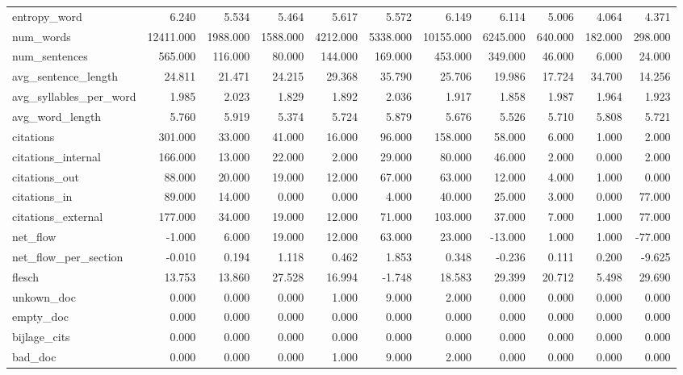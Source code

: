 \begin{tabular}{lrrrrrrrrrr}
\cline{1-11}
entropy\_word & 6.240 & 5.534 & 5.464 & 5.617 & 5.572 & 6.149 & 6.114 & 5.006 & 4.064 & 4.371 \\
\cline{1-11}
num\_words & 12411.000 & 1988.000 & 1588.000 & 4212.000 & 5338.000 & 10155.000 & 6245.000 & 640.000 & 182.000 & 298.000 \\
\cline{1-11}
num\_sentences & 565.000 & 116.000 & 80.000 & 144.000 & 169.000 & 453.000 & 349.000 & 46.000 & 6.000 & 24.000 \\
\cline{1-11}
avg\_sentence\_length & 24.811 & 21.471 & 24.215 & 29.368 & 35.790 & 25.706 & 19.986 & 17.724 & 34.700 & 14.256 \\
\cline{1-11}
avg\_syllables\_per\_word & 1.985 & 2.023 & 1.829 & 1.892 & 2.036 & 1.917 & 1.858 & 1.987 & 1.964 & 1.923 \\
\cline{1-11}
avg\_word\_length & 5.760 & 5.919 & 5.374 & 5.724 & 5.879 & 5.676 & 5.526 & 5.710 & 5.808 & 5.721 \\
\cline{1-11}
citations & 301.000 & 33.000 & 41.000 & 16.000 & 96.000 & 158.000 & 58.000 & 6.000 & 1.000 & 2.000 \\
\cline{1-11}
citations\_internal & 166.000 & 13.000 & 22.000 & 2.000 & 29.000 & 80.000 & 46.000 & 2.000 & 0.000 & 2.000 \\
\cline{1-11}
citations\_out & 88.000 & 20.000 & 19.000 & 12.000 & 67.000 & 63.000 & 12.000 & 4.000 & 1.000 & 0.000 \\
\cline{1-11}
citations\_in & 89.000 & 14.000 & 0.000 & 0.000 & 4.000 & 40.000 & 25.000 & 3.000 & 0.000 & 77.000 \\
\cline{1-11}
citations\_external & 177.000 & 34.000 & 19.000 & 12.000 & 71.000 & 103.000 & 37.000 & 7.000 & 1.000 & 77.000 \\
\cline{1-11}
net\_flow & -1.000 & 6.000 & 19.000 & 12.000 & 63.000 & 23.000 & -13.000 & 1.000 & 1.000 & -77.000 \\
\cline{1-11}
net\_flow\_per\_section & -0.010 & 0.194 & 1.118 & 0.462 & 1.853 & 0.348 & -0.236 & 0.111 & 0.200 & -9.625 \\
\cline{1-11}
flesch & 13.753 & 13.860 & 27.528 & 16.994 & -1.748 & 18.583 & 29.399 & 20.712 & 5.498 & 29.690 \\
\cline{1-11}
unkown\_doc & 0.000 & 0.000 & 0.000 & 1.000 & 9.000 & 2.000 & 0.000 & 0.000 & 0.000 & 0.000 \\
\cline{1-11}
empty\_doc & 0.000 & 0.000 & 0.000 & 0.000 & 0.000 & 0.000 & 0.000 & 0.000 & 0.000 & 0.000 \\
\cline{1-11}
bijlage\_cits & 0.000 & 0.000 & 0.000 & 0.000 & 0.000 & 0.000 & 0.000 & 0.000 & 0.000 & 0.000 \\
\cline{1-11}
bad\_doc & 0.000 & 0.000 & 0.000 & 1.000 & 9.000 & 2.000 & 0.000 & 0.000 & 0.000 & 0.000 \\
\cline{1-11}
\bottomrule
\end{tabular}
